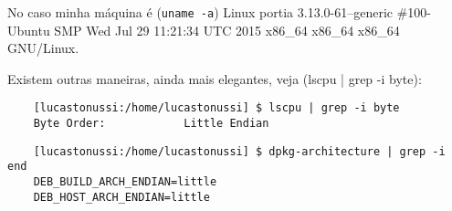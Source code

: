 \documentclass{article}
\begin{document}
No caso minha máquina é (\verb|uname -a|) Linux portia 3.13.0-61--generic
\#100-Ubuntu SMP Wed Jul 29 11:21:34 UTC 2015 x86\_64 x86\_64 x86\_64 GNU/Linux.

Existem outras maneiras, ainda mais elegantes, veja (lscpu | grep -i byte):

  \begin{verbatim}
    [lucastonussi:/home/lucastonussi] $ lscpu | grep -i byte
    Byte Order:            Little Endian
  \end{verbatim}

  \begin{verbatim}
    [lucastonussi:/home/lucastonussi] $ dpkg-architecture | grep -i end
    DEB_BUILD_ARCH_ENDIAN=little
    DEB_HOST_ARCH_ENDIAN=little
  \end{verbatim}
\end{document}
